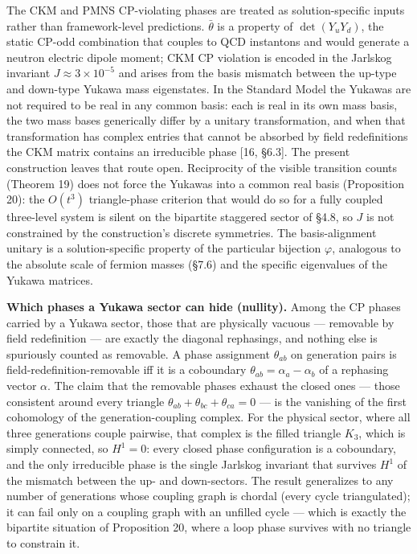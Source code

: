 \documentclass[
]{article}
\begin{document}
The CKM and PMNS CP-violating phases are treated as solution-specific
inputs rather than framework-level predictions. \(\bar\theta\) is a
property of \(\det(Y_u Y_d)\), the static CP-odd combination that
couples to QCD instantons and would generate a neutron electric dipole
moment; CKM CP violation is encoded in the Jarlskog invariant
\(J \approx 3 \times 10^{-5}\) and arises from the basis mismatch
between the up-type and down-type Yukawa mass eigenstates. In the
Standard Model the Yukawas are not required to be real in any common
basis: each is real in its own mass basis, the two mass bases
generically differ by a unitary transformation, and when that
transformation has complex entries that cannot be absorbed by field
redefinitions the CKM matrix contains an irreducible phase {[}16,
§6.3{]}. The present construction leaves that route open. Reciprocity of
the visible transition counts (Theorem 19) does not force the Yukawas
into a common real basis (Proposition 20): the \(O(t^3)\) triangle-phase
criterion that would do so for a fully coupled three-level system is
silent on the bipartite staggered sector of §4.8, so \(J\) is not
constrained by the construction's discrete symmetries. The
basis-alignment unitary is a solution-specific property of the
particular bijection \(\varphi\), analogous to the absolute scale of
fermion masses (§7.6) and the specific eigenvalues of the Yukawa
matrices.

\textbf{Which phases a Yukawa sector can hide (nullity).} Among the CP
phases carried by a Yukawa sector, those that are physically vacuous ---
removable by field redefinition --- are exactly the diagonal rephasings,
and nothing else is spuriously counted as removable. A phase assignment
\(\theta_{ab}\) on generation pairs is field-redefinition-removable iff
it is a coboundary \(\theta_{ab} = \alpha_a - \alpha_b\) of a rephasing
vector \(\alpha\). The claim that the removable phases exhaust the
closed ones --- those consistent around every triangle
\(\theta_{ab} + \theta_{bc} + \theta_{ca} = 0\) --- is the vanishing of
the first cohomology of the generation-coupling complex. For the
physical sector, where all three generations couple pairwise, that
complex is the filled triangle \(K_3\), which is simply connected, so
\(H^1 = 0\): every closed phase configuration is a coboundary, and the
only irreducible phase is the single Jarlskog invariant that survives
\(H^1\) of the mismatch between the up- and down-sectors. The result
generalizes to any number of generations whose coupling graph is chordal
(every cycle triangulated); it can fail only on a coupling graph with an
unfilled cycle --- which is exactly the bipartite situation of
Proposition 20, where a loop phase survives with no triangle to
constrain it.
\end{document}
